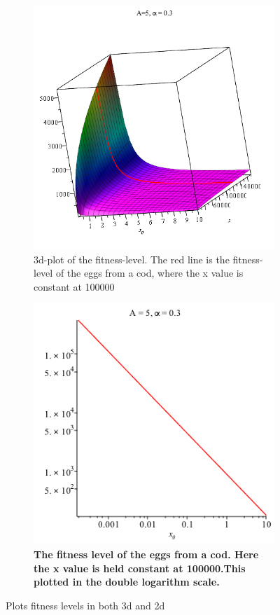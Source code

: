 \documentclass{article}
\numberwithin{equation}{section} %
\begin{document}
\begin{figure}[H]
\begin{subfigure}[t]{0.5\textwidth}
\includegraphics[width=0.9\linewidth]{exercises/ex5p21} 
\caption{3d-plot of the fitness-level. The red line is the fitness-level of the eggs from a cod, where the x value is constant at 100000}

\end{subfigure}
\begin{subfigure}[t]{0.5\textwidth}
\centering
\includegraphics[width=0.9\linewidth]{exercises/ex5p22}
\caption{\textbf{The fitness level of the eggs from a cod. Here the x value is held constant at 100000.This plotted in the double logarithm scale.}}
\label{fig:ex5p21}
\end{subfigure}
\caption{Plots fitness levels in both 3d and 2d} 
\label{fig:ex5p21}
\end{figure}
\end{document}
